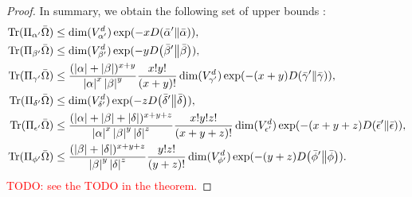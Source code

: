 \documentclass[notitlepage, 10pt]{article}
\begin{document}
\begin{proof}
    In summary, we obtain the following set of upper bounds :
    \begin{align}
        \operatorname{Tr}(\Pi_{\alpha'} \bar \Omega)
        &\leq \dim(V_{\alpha'}^{d}) \exp(- x D\!\left(\bar \alpha'\middle\|\bar \alpha\right)), \\
        \operatorname{Tr}(\Pi_{\beta'} \bar \Omega)
        &\leq \dim(V_{\beta'}^{d}) \exp(- y D\!\left(\bar \beta'\middle\|\bar \beta\right)), \\
        \operatorname{Tr}(\Pi_{\gamma'} \bar \Omega)
        &\leq \frac{(\left|\alpha\right|+\left|\beta\right|)^{x+y}}{\left|\alpha\right|^{x}\left|\beta\right|^{y}}\frac{x!y!}{(x+y)!}\dim(V_{\gamma'}^{d}) \exp(- (x+y) D\!\left(\bar \gamma'\middle\|\bar \gamma\right)), \\
        \operatorname{Tr}(\Pi_{\delta'} \bar \Omega)
        &\leq \dim(V_{\delta'}^{d}) \exp(- z D\!\left(\bar \delta'\middle\|\bar \delta\right)), \\
        \operatorname{Tr}(\Pi_{\epsilon'} \bar \Omega)
        &\leq \frac{(\left|\alpha\right|+\left|\beta\right|+\left|\delta\right|)^{x+y+z}}{\left|\alpha\right|^{x}\left|\beta\right|^{y}\left|\delta\right|^{z}}\frac{x!y!z!}{(x+y+z)!}\dim(V_{\epsilon'}^{d}) \exp(- (x+y+z) D\!\left(\bar \epsilon'\middle\|\bar \epsilon\right)), \\
        \operatorname{Tr}(\Pi_{\phi'} \bar \Omega)
        &\leq \frac{(\left|\beta\right|+\left|\delta\right|)^{x+y+z}}{\left|\beta\right|^{y}\left|\delta\right|^{z}}\frac{y!z!}{(y+z)!} \dim(V_{\phi'}^{d}) \exp(- (y+z) D\!\left(\bar \phi'\middle\|\bar \phi\right)).
    \end{align}
    \textcolor{red}{TODO: see the TODO in the theorem.}
\end{proof}

\end{document}
